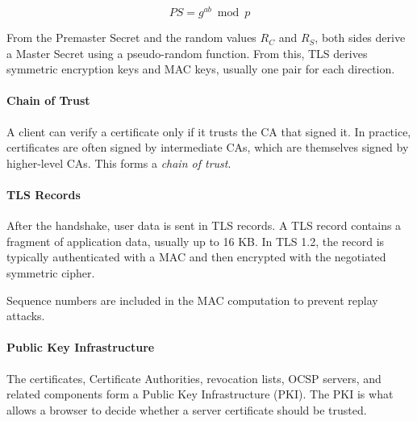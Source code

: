 \[
PS = g^{ab} \bmod p
\]

From the Premaster Secret and the random values $R_C$ and $R_S$, both
sides derive a Master Secret using a pseudo-random function. From this,
TLS derives symmetric encryption keys and MAC keys, usually one pair for
each direction.


\paragraph{Chain of Trust}

A client can verify a certificate only if it trusts the CA that signed
it. In practice, certificates are often signed by intermediate CAs, which
are themselves signed by higher-level CAs. This forms a \emph{chain of
trust}.


\paragraph{TLS Records}

After the handshake, user data is sent in TLS records. A TLS record
contains a fragment of application data, usually up to 16 KB. In TLS 1.2,
the record is typically authenticated with a MAC and then encrypted with
the negotiated symmetric cipher.

Sequence numbers are included in the MAC computation to prevent replay
attacks.




\paragraph{Public Key Infrastructure}

The certificates, Certificate Authorities, revocation lists, OCSP
servers, and related components form a Public Key Infrastructure (PKI).
The PKI is what allows a browser to decide whether a server certificate
should be trusted.

